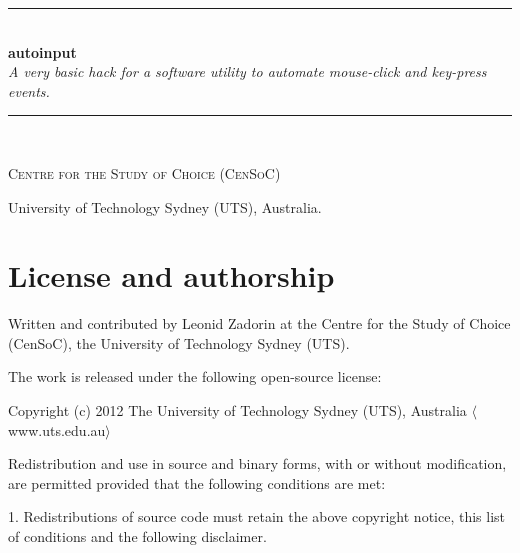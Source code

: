 \documentclass[12pt,a4paper]{article}
\begin{document}



\setlength{\parindent}{0pt}
\setlength{\parskip}{2ex}


\begin{titlepage}
\begin{center}



\vspace*{3cm}

\rule{\linewidth}{0.5mm} \\[0.4cm]
{ \huge \bfseries autoinput }\\[0.4cm]


{\large \emph{A very basic hack for a software utility to automate mouse-click and key-press events.}}
\rule{\linewidth}{0.5mm}
\\[1.5cm]



\vspace{3cm}

{\Large \textsc{Centre for the Study of Choice (CenSoC)}}

{\large University of Technology Sydney (UTS), Australia.}


\vfill


\end{center}

\end{titlepage}

\newpage
\tableofcontents

\newpage
\section{License and authorship}

Written and contributed by Leonid Zadorin at the Centre for the Study of Choice (CenSoC), the University of Technology Sydney (UTS).

The work is released under the following open-source license:

Copyright (c) 2012 The University of Technology Sydney (UTS), Australia \(\langle\)www.uts.edu.au\(\rangle\)

Redistribution and use in source and binary forms, with or without modification, are permitted provided that the following conditions are met:

1. Redistributions of source code must retain the above copyright notice, this list of conditions and the following disclaimer.
\end{document}
